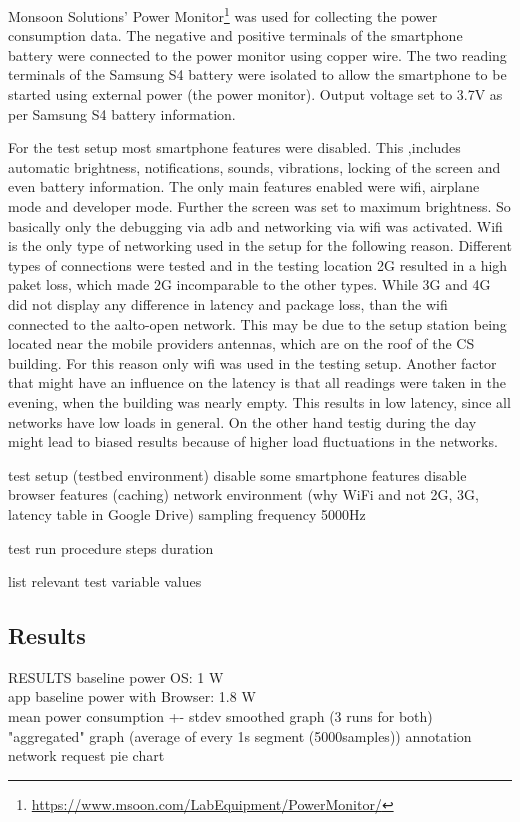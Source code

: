 \documentclass{article}
\begin{document}
Monsoon Solutions' Power Monitor\footnote{\url{https://www.msoon.com/LabEquipment/PowerMonitor/}} was used for collecting the power consumption data. The negative and positive terminals of the smartphone battery were connected to the power monitor using copper wire. The two reading terminals of the Samsung S4 battery were isolated to allow the smartphone to be started using external power (the power monitor). Output voltage set to 3.7V as per Samsung S4 battery information.

For the test setup most smartphone features were disabled. This ,includes automatic brightness, notifications, sounds, vibrations, locking of the screen and even battery information. The only main features enabled were wifi, airplane mode and developer mode. Further the screen was set to maximum brightness.
So basically only the debugging via adb and networking via wifi was activated.
Wifi is the only type of networking used in the setup for the following reason.
Different types of connections were tested and in the testing location 2G resulted in a high paket loss, which made 2G incomparable to the other types. While 3G and 4G did not display any difference in latency and package loss, than the wifi connected to the aalto-open network. This may be due to the setup station being located near the mobile providers antennas, which are on the roof of the CS building. For this reason only wifi was used in the testing setup. Another factor that might have an influence on the latency is that all readings were taken in the evening, when the building was nearly empty. This results in low latency, since all networks have low loads in general. On the other hand testig during the day might lead to biased results because of higher load fluctuations in the networks.


test setup (testbed environment)
    disable some smartphone features
    disable browser features (caching)
    network environment (why WiFi and not 2G, 3G, latency table in Google Drive)
    sampling frequency 5000Hz

test run procedure
    steps
    duration

list relevant test variable values


\subsection{Results}
\label{chapter:results}

RESULTS
    baseline power OS: 1 W \\
    app baseline power with Browser: 1.8 W \\
    mean power consumption +- stdev
    smoothed graph (3 runs for both)
    "aggregated" graph (average of every 1s segment (5000samples))
        annotation
    network request pie chart
\end{document}

